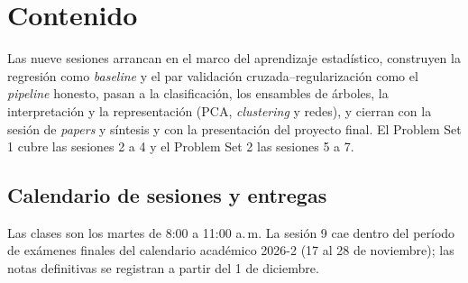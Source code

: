 \documentclass[12pt,a4paper]{article}
\begin{document}
\section{Contenido}

Las nueve sesiones arrancan en el marco del aprendizaje estadístico, construyen la regresión como \emph{baseline} y el par validación cruzada--regularización como el \emph{pipeline} honesto, pasan a la clasificación, los ensambles de árboles, la interpretación y la representación (PCA, \emph{clustering} y redes), y cierran con la sesión de \emph{papers} y síntesis y con la presentación del proyecto final. El Problem Set 1 cubre las sesiones 2 a 4 y el Problem Set 2 las sesiones 5 a 7.

\subsection{Calendario de sesiones y entregas}

Las clases son los martes de 8:00 a 11:00 a.\,m. La sesión 9 cae dentro del período de exámenes finales del calendario académico 2026-2 (17 al 28 de noviembre); las notas definitivas se registran a partir del 1 de diciembre.
\end{document}
